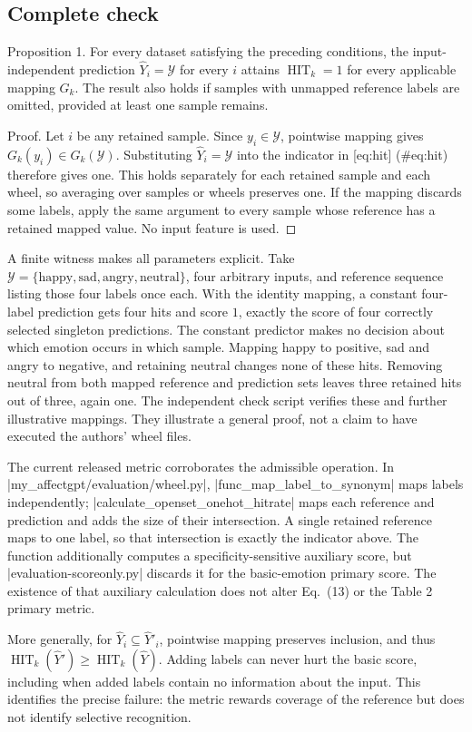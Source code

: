 \documentclass[10pt]{article}
\begin{document}
\subsection*{Complete check}
Proposition 1.  For every dataset satisfying the preceding conditions, the input-independent prediction \(\widehat Y_i=\mathcal Y\) for every \(i\) attains \(\operatorname{HIT}_k=1\) for every applicable mapping \(G_k\). The result also holds if samples with unmapped reference labels are omitted, provided at least one sample remains.\par
Proof. Let \(i\) be any retained sample. Since \(y_i\in\mathcal Y\), pointwise mapping gives \(G_k(y_i)\in G_k(\mathcal Y)\). Substituting \(\widehat Y_i=\mathcal Y\) into the indicator in [eq:hit] (\#eq:hit) therefore gives one. This holds separately for each retained sample and each wheel, so averaging over samples or wheels preserves one. If the mapping discards some labels, apply the same argument to every sample whose reference has a retained mapped value. No input feature is used. ◻\par
A finite witness makes all parameters explicit. Take \(\mathcal Y=\{\mathrm{happy},\mathrm{sad},\mathrm{angry},\mathrm{neutral}\}\), four arbitrary inputs, and reference sequence listing those four labels once each. With the identity mapping, a constant four-label prediction gets four hits and score \(1\), exactly the score of four correctly selected singleton predictions. The constant predictor makes no decision about which emotion occurs in which sample. Mapping happy to positive, sad and angry to negative, and retaining neutral changes none of these hits. Removing neutral from both mapped reference and prediction sets leaves three retained hits out of three, again one. The independent check script verifies these and further illustrative mappings. They illustrate a general proof, not a claim to have executed the authors’ wheel files.\par
The current released metric corroborates the admissible operation. In |my\_affectgpt/evaluation/wheel.py|, |func\_map\_label\_to\_synonym| maps labels independently; |calculate\_openset\_onehot\_hitrate| maps each reference and prediction and adds the size of their intersection. A single retained reference maps to one label, so that intersection is exactly the indicator above. The function additionally computes a specificity-sensitive auxiliary score, but |evaluation-scoreonly.py| discards it for the basic-emotion primary score. The existence of that auxiliary calculation does not alter Eq. (13) or the Table 2 primary metric.\par
More generally, for \(\widehat Y_i\subseteq\widehat Y'_i\), pointwise mapping preserves inclusion, and thus \(\operatorname{HIT}_k(\widehat Y')\geq\operatorname{HIT}_k(\widehat Y)\). Adding labels can never hurt the basic score, including when added labels contain no information about the input. This identifies the precise failure: the metric rewards coverage of the reference but does not identify selective recognition.\par
\end{document}
